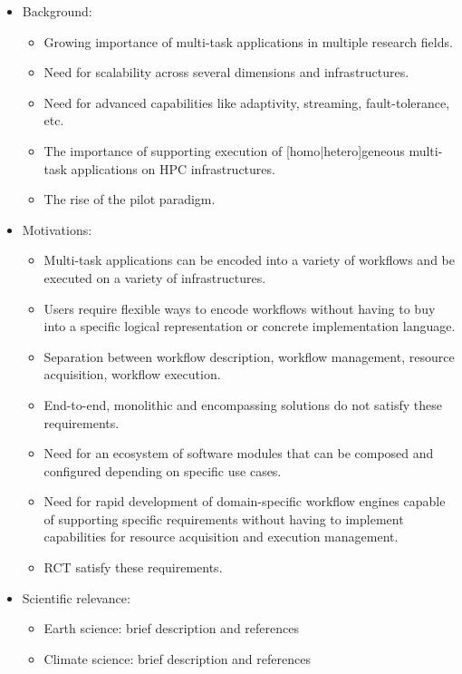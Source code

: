 \documentclass[preprint,12pt, a4paper]{elsarticle}
\begin{document}
\begin{itemize}
  \item Background:
    \begin{itemize}
      \item Growing importance of multi-task applications in multiple
      research fields.
      \item Need for scalability across several dimensions and
      infrastructures.
      \item Need for advanced capabilities like adaptivity, streaming,
      fault-tolerance, etc.
      \item The importance of supporting execution of [homo|hetero]geneous
      multi-task applications on HPC infrastructures.
      \item The rise of the pilot paradigm.
    \end{itemize}
  \item Motivations:
    \begin{itemize}
      \item Multi-task applications can be encoded into a variety of
      workflows and be executed on a variety of infrastructures.
      \item Users require flexible ways to encode workflows without having to
      buy into a specific logical representation or concrete implementation
      language.
      \item Separation between workflow description, workflow management,
      resource acquisition, workflow execution.
      \item End-to-end, monolithic and encompassing solutions do not satisfy
      these requirements.
      \item Need for an ecosystem of software modules that can be composed
      and configured depending on specific use cases.
      \item Need for rapid development of domain-specific workflow engines
      capable of supporting specific requirements without having to implement
      capabilities for resource acquisition and execution management.
      \item RCT satisfy these requirements.
    \end{itemize}
  \item Scientific relevance:
    \begin{itemize}
      \item Earth science: brief description and references
      \item Climate science: brief description and references

\end{itemize}
\end{itemize}
\end{document}

